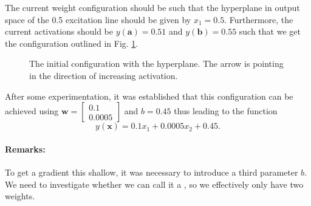 \documentclass{article}
\let\vec\mathbf
\begin{document}
The current weight configuration should be such that the hyperplane in output space of the 0.5 excitation line should be given by $x_1=0.5$.
Furthermore, the current activations should be $y(\vec{a}) = 0.51$ and $y(\vec{b}) = 0.55$ such that we get the configuration outlined in Fig. \ref{week5:initial}.
\begin{figure}[h]
    
    \centering


    \caption{The initial configuration with the hyperplane. The arrow is pointing in the direction of increasing activation.}
    \label{week5:initial}
\end{figure}

After some experimentation, it was established that this configuration can be achieved using
$\vec{w} = \begin{bmatrix}
    0.1 \\ 0.0005
\end{bmatrix}$
and $b = 0.45$ thus leading to the function
\begin{equation*}
    y(\vec{x}) = 0.1 x_1 + 0.0005 x_2 + 0.45.
\end{equation*}

\paragraph{Remarks:}
To get a gradient this shallow, it was necessary to introduce a third parameter $b$. 
We need to investigate whether we can call it a , so we effectively only have two weights.
\end{document}
